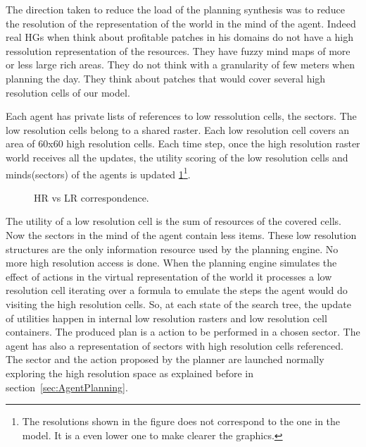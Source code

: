 \documentclass[11pt,oneside,a4paper,openright]{report}
\begin{document}
The direction taken to reduce the load of the planning synthesis was to reduce the resolution of the representation of the world in the mind of the agent. Indeed real HGs when think about profitable patches in his domains do not have a high ressolution representation of the resources. They have fuzzy mind maps of more or less large rich areas. They do not think with a granularity of few meters when planning the day. They think about patches that would cover several high resolution cells of our model.

Each agent has private lists of references to low ressolution cells, the sectors. The low resolution cells belong to a shared raster. Each low resolution cell covers an area of 60x60 high resolution cells. Each time step, once the high resolution raster world receives all the updates, the utility scoring of the low resolution cells and minds(sectors) of the agents is updated \ref{fig:LRMaps1}\footnote{The resolutions shown in the figure does not correspond to the one in the model. It is a even lower one to make clearer the graphics.}.

		\begin{figure}[!h]
		\centering
		\setlength\fboxsep{0pt}
		\setlength\fboxrule{0.5pt}
		\caption{HR vs LR correspondence.}
		\label{fig:LRMaps1}
		\end{figure}

The utility of a low resolution cell is the sum of resources of the covered cells. Now the sectors in the mind of the agent contain less items. These low resolution structures are the only information resource used by the planning engine. No more high resolution access is done. When the planning engine simulates the effect of actions in the virtual representation of the world it processes a low resolution cell iterating over a formula to emulate the steps the agent would do visiting the high resolution cells. So, at each state of the search tree, the update of utilities happen in internal low resolution rasters and low resolution cell containers. The produced plan is a action to be performed in a chosen sector. The agent has also a representation of sectors with high resolution cells referenced. The sector and the action proposed by the planner are launched normally exploring the high resolution space as explained before in section~\ref{sec:AgentPlanning}.
\end{document}
